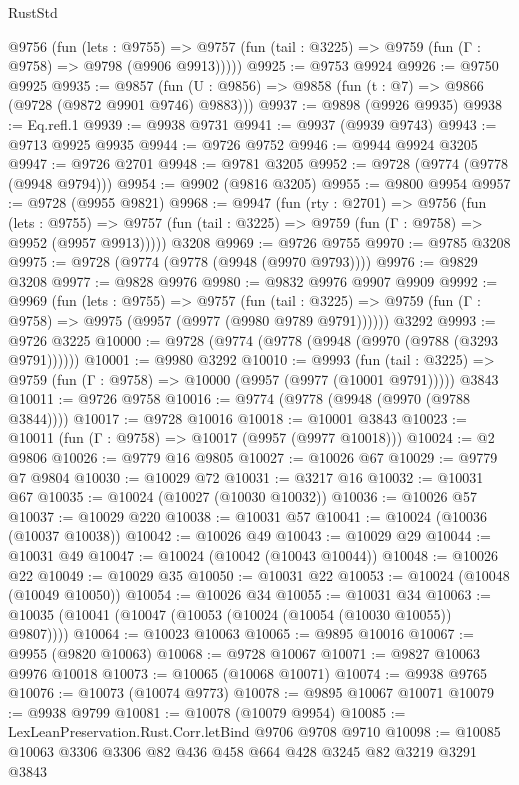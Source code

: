 \begin{lexlean}{RustStd}
\begin{coremodule}
{\begin{coremodule}
{{{{{{{{{{{{{{{{{{{{{{{{{{    @9756
      (fun (lets : @9755) =>
      @9757 (fun (tail : @3225) => @9759 (fun (Γ : @9758) => @9798 (@9906 @9913)))))
@9925 := @9753 @9924
@9926 := @9750 @9925
@9935 := @9857 (fun (U : @9856) => @9858 (fun (t : @7) => @9866 (@9728 (@9872 @9901 @9746) @9883)))
@9937 := @9898 (@9926 @9935)
@9938 := Eq.refl.{1}
@9939 := @9938 @9731
@9941 := @9937 (@9939 @9743)
@9943 := @9713 @9925 @9935
@9944 := @9726 @9752
@9946 := @9944 @9924 @3205
@9947 := @9726 @2701
@9948 := @9781 @3205
@9952 := @9728 (@9774 (@9778 (@9948 @9794)))
@9954 := @9902 (@9816 @3205)
@9955 := @9800 @9954
@9957 := @9728 (@9955 @9821)
@9968 := @9947
    (fun (rty : @2701) =>
    @9756
      (fun (lets : @9755) =>
      @9757 (fun (tail : @3225) => @9759 (fun (Γ : @9758) => @9952 (@9957 @9913)))))
    @3208
@9969 := @9726 @9755
@9970 := @9785 @3208
@9975 := @9728 (@9774 (@9778 (@9948 (@9970 @9793))))
@9976 := @9829 @3208
@9977 := @9828 @9976
@9980 := @9832 @9976 @9907 @9909
@9992 := @9969
    (fun (lets : @9755) =>
    @9757
      (fun (tail : @3225) => @9759 (fun (Γ : @9758) => @9975 (@9957 (@9977 (@9980 @9789 @9791))))))
    @3292
@9993 := @9726 @3225
@10000 := @9728 (@9774 (@9778 (@9948 (@9970 (@9788 (@3293 @9791))))))
@10001 := @9980 @3292
@10010 := @9993
    (fun (tail : @3225) => @9759 (fun (Γ : @9758) => @10000 (@9957 (@9977 (@10001 @9791)))))
    @3843
@10011 := @9726 @9758
@10016 := @9774 (@9778 (@9948 (@9970 (@9788 @3844))))
@10017 := @9728 @10016
@10018 := @10001 @3843
@10023 := @10011 (fun (Γ : @9758) => @10017 (@9957 (@9977 @10018)))
@10024 := @2 @9806
@10026 := @9779 @16 @9805
@10027 := @10026 @67
@10029 := @9779 @7 @9804
@10030 := @10029 @72
@10031 := @3217 @16
@10032 := @10031 @67
@10035 := @10024 (@10027 (@10030 @10032))
@10036 := @10026 @57
@10037 := @10029 @220
@10038 := @10031 @57
@10041 := @10024 (@10036 (@10037 @10038))
@10042 := @10026 @49
@10043 := @10029 @29
@10044 := @10031 @49
@10047 := @10024 (@10042 (@10043 @10044))
@10048 := @10026 @22
@10049 := @10029 @35
@10050 := @10031 @22
@10053 := @10024 (@10048 (@10049 @10050))
@10054 := @10026 @34
@10055 := @10031 @34
@10063 := @10035 (@10041 (@10047 (@10053 (@10024 (@10054 (@10030 @10055)) @9807))))
@10064 := @10023 @10063
@10065 := @9895 @10016
@10067 := @9955 (@9820 @10063)
@10068 := @9728 @10067
@10071 := @9827 @10063 @9976 @10018
@10073 := @10065 (@10068 @10071)
@10074 := @9938 @9765
@10076 := @10073 (@10074 @9773)
@10078 := @9895 @10067 @10071
@10079 := @9938 @9799
@10081 := @10078 (@10079 @9954)
@10085 := LexLeanPreservation.Rust.Corr.letBind @9706 @9708 @9710
@10098 := @10085 @10063 @3306 @3306 @82 @436 @458 @664 @428 @3245 @82 @3219 @3291 @3843
}}}}}}}}}}}}}}}}}}}}}}}}}}
\end{coremodule}}
\end{coremodule}
\end{lexlean}
